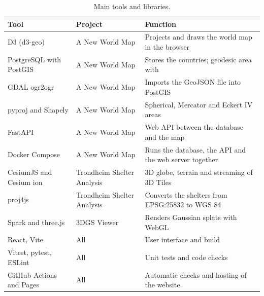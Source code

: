 \begin{table}[!ht]
\centering
\caption{Main tools and libraries.}
\label{tab:tools}
\small
\begin{tabularx}{\textwidth}{L{3.6cm} L{2.6cm} Y}
\toprule
Tool & Project & Function \\
\midrule
D3 (d3-geo) \citep{d3} & A New World Map & Projects and draws the world map in the browser \\
PostgreSQL with PostGIS & A New World Map & Stores the countries; geodesic area with  \citep{postgis-starea} \\
GDAL ogr2ogr \citep{gdal-ogr2ogr} & A New World Map & Imports the GeoJSON file into PostGIS \\
pyproj \citep{pyproj} and Shapely \citep{shapely} & A New World Map & Spherical, Mercator and Eckert IV areas \\
FastAPI \citep{fastapi} & A New World Map & Web API between the database and the map \\
Docker Compose & A New World Map & Runs the database, the API and the web server together \\
CesiumJS \citep{cesiumjs} and Cesium ion & Trondheim Shelter Analysis & 3D globe, terrain and streaming of 3D Tiles \\
proj4js & Trondheim Shelter Analysis & Converts the shelters from EPSG:25832 to WGS 84 \\
Spark \citep{spark} and three.js \citep{threejs} & 3DGS Viewer & Renders Gaussian splats with WebGL \\
React, Vite & All & User interface and build \\
Vitest, pytest, ESLint & All & Unit tests and code checks \\
GitHub Actions and Pages \citep{ghpages} & All & Automatic checks and hosting of the website \\
\bottomrule
\end{tabularx}
\end{table}
